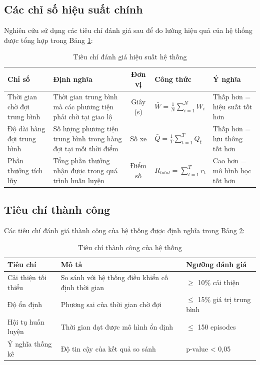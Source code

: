 \subsection{Các chỉ số hiệu suất chính}
Nghiên cứu sử dụng các tiêu chí đánh giá sau để đo lường hiệu quả của hệ thống được tổng hợp trong Bảng \ref{tab:evaluation_criteria}:

\begin{table}[!htp]
\centering
\caption{Tiêu chí đánh giá hiệu suất hệ thống}
\label{tab:evaluation_criteria}
\begin{tabular}{|l|p{3cm}|c|p{3.5cm}|p{3.5cm}|}
\hline
\textbf{Chỉ số} & \textbf{Định nghĩa} & \textbf{Đơn vị} & \textbf{Công thức} & \textbf{Ý nghĩa} \\
\hline
Thời gian chờ đợi trung bình & Thời gian trung bình mà các phương tiện phải chờ tại giao lộ & Giây (s) & $\bar{W} = \frac{1}{N} \sum_{i=1}^{N} W_i$ & Thấp hơn = hiệu suất tốt hơn \\
\hline
Độ dài hàng đợi trung bình & Số lượng phương tiện trung bình trong hàng đợi tại mỗi thời điểm & Số xe & $\bar{Q} = \frac{1}{T} \sum_{t=1}^{T} Q_t$ & Thấp hơn = lưu thông tốt hơn \\
\hline
Phần thưởng tích lũy & Tổng phần thưởng nhận được trong quá trình huấn luyện & Điểm số & $R_{total} = \sum_{t=1}^{T} r_t$ & Cao hơn = mô hình học tốt hơn \\
\hline
\end{tabular}
\end{table}

\subsection{Tiêu chí thành công}
Các tiêu chí đánh giá thành công của hệ thống được định nghĩa trong Bảng \ref{tab:success_criteria}:

\begin{table}[!htp]
\centering
\caption{Tiêu chí thành công của hệ thống}
\label{tab:success_criteria}
\begin{tabular}{|l|p{8cm}|p{4cm}|}
\hline
\textbf{Tiêu chí} & \textbf{Mô tả} & \textbf{Ngưỡng đánh giá} \\
\hline
Cải thiện tối thiểu & So sánh với hệ thống điều khiển cố định thời gian & $\geq$ 10\% cải thiện \\
\hline
Độ ổn định & Phương sai của thời gian chờ đợi & $\leq$ 15\% giá trị trung bình \\
\hline
Hội tụ huấn luyện & Thời gian đạt được mô hình ổn định & $\leq$ 150 episodes \\
\hline
Ý nghĩa thống kê & Độ tin cậy của kết quả so sánh & p-value < 0,05 \\
\hline
\end{tabular}
\end{table}

